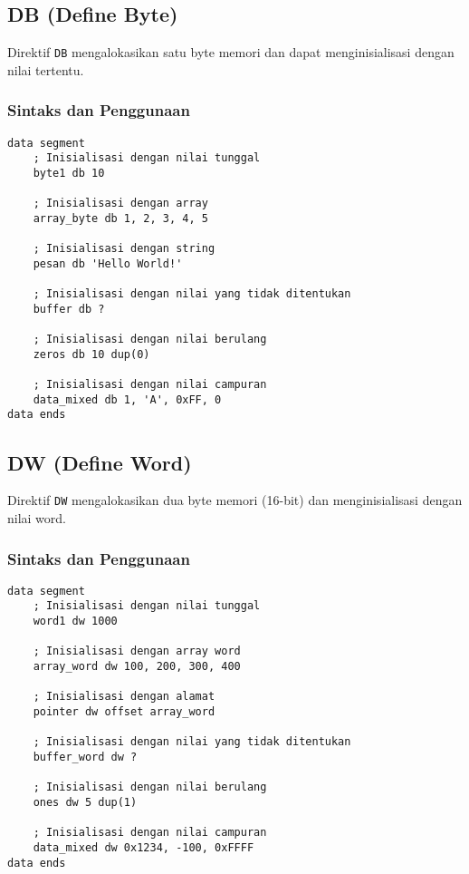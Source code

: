 \documentclass[../main.tex]{subfiles}
\begin{document}
\subsection{DB (Define Byte)}
Direktif \texttt{DB} mengalokasikan satu byte memori dan dapat menginisialisasi dengan nilai tertentu.

\subsubsection{Sintaks dan Penggunaan}
\begin{lstlisting}[language={[x86masm]Assembler}, caption=Contoh Penggunaan DB, label={lst:db-examples}]
data segment
    ; Inisialisasi dengan nilai tunggal
    byte1 db 10
    
    ; Inisialisasi dengan array
    array_byte db 1, 2, 3, 4, 5
    
    ; Inisialisasi dengan string
    pesan db 'Hello World!'
    
    ; Inisialisasi dengan nilai yang tidak ditentukan
    buffer db ?
    
    ; Inisialisasi dengan nilai berulang
    zeros db 10 dup(0)
    
    ; Inisialisasi dengan nilai campuran
    data_mixed db 1, 'A', 0xFF, 0
data ends
\end{lstlisting}

\subsection{DW (Define Word)}
Direktif \texttt{DW} mengalokasikan dua byte memori (16-bit) dan menginisialisasi dengan nilai word.

\subsubsection{Sintaks dan Penggunaan}
\begin{lstlisting}[language={[x86masm]Assembler}, caption=Contoh Penggunaan DW, label={lst:dw-examples}]
data segment
    ; Inisialisasi dengan nilai tunggal
    word1 dw 1000
    
    ; Inisialisasi dengan array word
    array_word dw 100, 200, 300, 400
    
    ; Inisialisasi dengan alamat
    pointer dw offset array_word
    
    ; Inisialisasi dengan nilai yang tidak ditentukan
    buffer_word dw ?
    
    ; Inisialisasi dengan nilai berulang
    ones dw 5 dup(1)
    
    ; Inisialisasi dengan nilai campuran
    data_mixed dw 0x1234, -100, 0xFFFF
data ends
\end{lstlisting}
\end{document}
